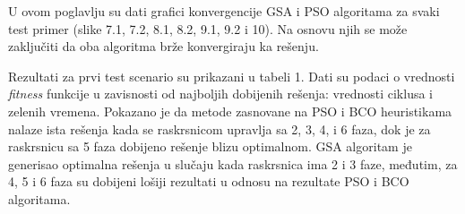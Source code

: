 U ovom poglavlju su dati grafici konvergencije GSA i PSO algoritama za svaki test primer (slike 7.1, 7.2, 8.1, 8.2, 9.1, 9.2 i 10). Na osnovu njih se može zaključiti da oba algoritma brže konvergiraju ka rešenju.

Rezultati za prvi test scenario su prikazani u tabeli 1. Dati su podaci o vrednosti \emph{fitness} funkcije u zavisnosti od najboljih dobijenih rešenja: vrednosti ciklusa i zelenih vremena. Pokazano je da metode zasnovane na PSO i BCO heuristikama nalaze ista rešenja kada se raskrsnicom upravlja sa 2, 3, 4, i 6 faza, dok je za raskrsnicu sa 5 faza dobijeno rešenje blizu optimalnom. GSA algoritam je generisao optimalna rešenja u slučaju kada raskrsnica ima 2 i 3 faze, međutim, za 4, 5 i 6 faza su dobijeni lošiji rezultati u odnosu na rezultate PSO i BCO algoritama. 



